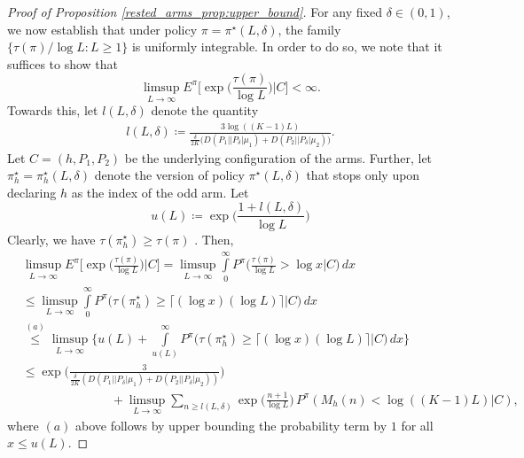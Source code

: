 \begin{proof}[Proof of Proposition \ref{rested_arms_prop:upper_bound}]
For any fixed $\delta\in(0,1)$, we now establish that under policy $\pi=\pi^\star(L,\delta)$, the family $\{\tau(\pi)/\log L:L\geq 1\}$ is uniformly integrable. In order to do so, we note that it suffices to show that
\begin{equation}
	\limsup\limits_{L\to\infty}E^\pi\bigg[\exp\bigg(\frac{\tau(\pi)}{\log L}\bigg)\bigg|C\bigg]<\infty.
\end{equation}
Towards this, let $l(L,\delta)$ denote the quantity
\begingroup\allowdisplaybreaks\begin{align}
	l(L,\delta)\coloneqq\frac{3\log((K-1)L)}{\frac{\delta}{2K}\bigg(D(P_1||P_\delta|\mu_1)+D(P_2||P_\delta|\mu_2)\bigg)}.\label{rested_arms_eq:l(L,delta)}
\end{align}\endgroup
Let $C=(h,P_1,P_2)$ be the underlying configuration of the arms. Further, let $\pi^\star_h=\pi^\star_h(L,\delta)$ denote the version of policy $\pi^{\star}(L,\delta)$ that stops only upon declaring $h$ as the index of the odd arm. Let
\begin{equation}
	u(L)\coloneqq\exp\bigg(\frac{1+l(L,\delta)}{\log L}\bigg)
\end{equation}
Clearly, we have $\tau(\pi^\star_h)\geq \tau(\pi)$ . Then,
\begingroup\allowdisplaybreaks\begin{align}
	&\limsup\limits_{L\to\infty}E^\pi\bigg[\exp\bigg(\frac{\tau(\pi)}{\log L}\bigg)\bigg|C\bigg]
	=\limsup\limits_{L\to\infty}\int\limits_{0}^{\infty}P^\pi\bigg(\frac{\tau(\pi)}{\log L}>\log x\bigg|C\bigg)\,dx\nonumber\\
	&\leq \limsup\limits_{L\to\infty}\int\limits_{0}^{\infty}P^\pi\bigg({\tau(\pi^\star_h)}\geq \lceil(\log x)({\log L})\rceil\bigg|C\bigg)\,dx\nonumber\\
	&\stackrel{(a)}{\leq} \limsup\limits_{L\to\infty}\bigg\lbrace u(L)+\int\limits_{u(L)}^{\infty}P^\pi\bigg({\tau(\pi^\star_h)}\geq \lceil(\log x)({\log L})\rceil\bigg|C\bigg)\,dx\bigg\rbrace\nonumber\\
	&\leq \exp\bigg(\frac{3}{\frac{\delta}{2K}(D(P_1||P_\delta|\mu_1)+D(P_2||P_\delta|\mu_2))}\bigg)\nonumber\\
	&\hspace{3cm}+\limsup\limits_{L\to\infty}\sum\limits_{n\geq l(L,\delta)}\exp\bigg(\frac{n+1}{\log L}\bigg)\,P^\pi(M_h(n)<\log((K-1)L)|C),\label{rested_arms_eq:uniform_integrability_1}
\end{align}\endgroup
where $(a)$ above follows by upper bounding the probability term by $1$ for all $x\leq u(L)$.


\end{proof}
